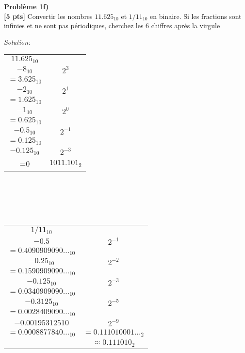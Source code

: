 \documentclass{article}
\newenvironment{problem}[2][Problème]
    { \begin{mdframed}[backgroundcolor=gray!20] \textbf{#1 #2} \\}
    {  \end{mdframed}}
\newenvironment{solution}
    {\textit{Solution:}}
    {}
\begin{document}
\begin{problem}{1f)}
    \textbf{[5 pts]} Convertir les nombres $11.625_{10}$ et $1/11_{10}$ en binaire. Si les fractions sont infinies et ne sont pas périodiques, cherchez les 6 chiffres après la virgule
\end{problem}
\begin{solution}
    \begin{tabular}{|c|c|}
        \hline
        $11.625_{10}$               &  \\
        $-8_{10}$                   & $2^3$ \\
        \hline          
        $=3.625_{10}$               &  \\
        $-2_{10}$                   & $2^1$ \\
        \hline          
        $=1.625_{10}$               &  \\
        $-1_{10}$                   & $2^0$ \\
        \hline          
        $=0.625_{10}$               &  \\
        $-0.5_{10}$                 & $2^{-1}$ \\
        \hline          
        $=0.125_{10}$               &  \\
        $-0.125_{10}$               & $2^{-3}$ \\
        \hline          
        =0                          & $1011.101_2$\\
        \hline
    \end{tabular}
    \\\\\\\\
    \begin{tabular}{|c|c|}
        \hline
        $1/11_{10}$                 & \\
        $-0.5$                      & $2^{-1}$ \\
        \hline
        $=0.4090909090\dots_{10}$   & \\
        $-0.25_{10}$                & $2^{-2}$ \\
        \hline
        $=0.1590909090\dots_{10}$   & \\
        $-0.125_{10}$               & $2^{-3}$ \\
        \hline
        $=0.0340909090\dots_{10}$   & \\
        $-0.3125_{10}$              & $2^{-5}$ \\
        \hline
        $=0.0028409090\dots_{10}$   & \\
        $-0.001953125{10}$          & $2^{-9}$ \\
        \hline
        $=0.0008877840\dots_{10}$   & $=0.111010001\dots_2$ \\
        \hline
                                    & $\approx0.111010_2$ \\
        \hline

    \end{tabular}
\end{solution}
\end{document}
